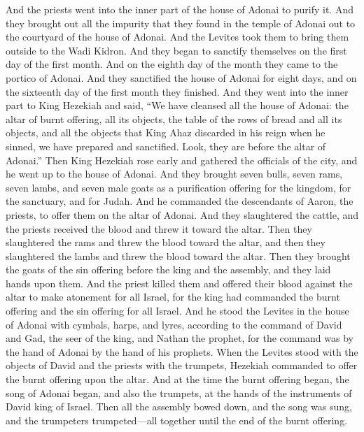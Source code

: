 \begin{biblechapter}
\verse And the priests went into the inner part of the house of Adonai to purify it. And they brought out all the impurity that they found in the temple of Adonai out to the courtyard of the house of Adonai. And the Levites took them to bring them outside to the Wadi Kidron.
\verse And they began to sanctify themselves on the first day of the first month. And on the eighth day of the month they came to the portico of Adonai. And they sanctified the house of Adonai for eight days, and on the sixteenth day of the first month they finished.
\verse And they went into the inner part to King Hezekiah and said, “We have cleansed all the house of Adonai: the altar of burnt offering, all its objects, the table of the rows of bread and all its objects,
\verse and all the objects that King Ahaz discarded in his reign when he sinned, we have prepared and sanctified. Look, they are before the altar of Adonai.”
\verse Then King Hezekiah rose early and gathered the officials of the city, and he went up to the house of Adonai.
\verse And they brought seven bulls, seven rams, seven lambs, and seven male goats as a purification offering for the kingdom, for the sanctuary, and for Judah. And he commanded the descendants of Aaron, the priests, to offer them on the altar of Adonai.
\verse And they slaughtered the cattle, and the priests received the blood and threw it toward the altar. Then they slaughtered the rams and threw the blood toward the altar, and then they slaughtered the lambs and threw the blood toward the altar.
\verse Then they brought the goats of the sin offering before the king and the assembly, and they laid hands upon them.
\verse And the priest killed them and offered their blood against the altar to make atonement for all Israel, for the king had commanded the burnt offering and the sin offering for all Israel.
\verse And he stood the Levites in the house of Adonai with cymbals, harps, and lyres, according to the command of David and Gad, the seer of the king, and Nathan the prophet, for the command was by the hand of Adonai by the hand of his prophets.
\verse When the Levites stood with the objects of David and the priests with the trumpets,
\verse Hezekiah commanded to offer the burnt offering upon the altar. And at the time the burnt offering began, the song of Adonai began, and also the trumpets, at the hands of the instruments of David king of Israel.
\verse Then all the assembly bowed down, and the song was sung, and the trumpeters trumpeted—all together until the end of the burnt offering.

\end{biblechapter}
